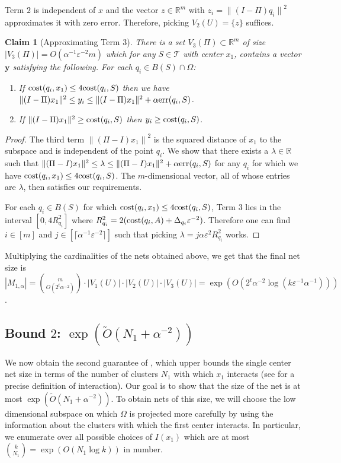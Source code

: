 \documentclass[11pt]{article}
\newtheorem{claim}[lemma]{Claim}
\theoremstyle{restate}
\theoremstyle{definition}
\newcommand{\eps}{\ensuremath{\varepsilon}}
\newcommand{\R}{\ensuremath{\mathbb{R}}}
\newcommand{\norm}[1]{\ensuremath{\|#1\|}}
\newcommand{\vecy}{\ensuremath{\mathbf{y}}}
\newcommand{\cost}{\textnormal{cost}}
\newcommand{\err}{\textnormal{err}}
\begin{document}
Term $2$ is independent of $x$ and the vector $z \in \R^m$ with $z_i =\norm{(I-\Pi)q_i}^2$ approximates it with zero error. Therefore, picking $V_2(U) = \{z\}$ suffices.

\begin{claim}[Approximating Term 3]\label{clm: term-3}
        There  is a set $V_3(\Pi) \subset \R^m$ of size $|V_3(\Pi)| = O(\alpha^{-1}\eps^{-2}m)$ which for any $S \in \mathcal{T}$ with center $x_1$, contains a vector $\vecy$ satisfying the following. For each $q_i \in B(S) \cap \Omega$:
    \begin{enumerate}
        \item If $\cost(q_i, x_1) \leq 4 \cost(q_i,S)$ then we have $\norm{(I - \Pi)x_1}^2\leq y_i \leq \norm{(I - \Pi)x_1}^2+\alpha \err(q_i,S) $.
        \item If $\norm{(I - \Pi)x_1}^2 \geq \cost(q_i, S)$ then $y_i \geq \cost(q_i,S)$.
    \end{enumerate}
\end{claim}
\begin{proof}
The third term $\norm{(\Pi - I) x_1}^2$ is the squared distance of $x_1$ to the subspace and is independent of the point $q_i$. We show that there exists a $\lambda \in \R$ such that $\norm{(\Pi - I)x_1}^2 \leq \lambda \leq \norm{(\Pi - I)x_1}^2 + \alpha \err(q_i,S)$ for any $q_i$ for which we have $\cost(q_i,x_1) \leq 4 \cost(q_i,S)$. The $m$-dimensional vector, all of whose entries are $\lambda$, then satisfies our requirements.

For each $q_i \in B(S)$ for which $\cost(q_i, x_1) \leq 4 \cost(q_i, S)$, Term $3$ lies in the interval $[0, 4R_{q_i}^2]$ where $R_{q_{i}}^2 = 2(\cost(q_i,A) + \Delta_{q_i} \eps^{-2})$. Therefore one can find $i \in [m]$ and $j \in [ \lceil\alpha^{-1} \eps^{-2} \rceil]$ such that  picking $\lambda= j \alpha \eps^2 R_{q_i}^2$ works.\qedhere

\end{proof}

Multiplying the cardinalities of the nets obtained above, we get that the final net size is $|M_{1,\alpha}| = \binom{m}{O(2^t \alpha^{-2})} \cdot |V_1(U)| \cdot |V_2(U)|
 \cdot |V_3(U)| = \exp(O(2^t \alpha^{-2} \log(k\eps^{-1} \alpha^{-1})))$.




\subsection{\texorpdfstring{Bound $2$: $\exp(\tilde{O}(N_1 + \alpha^{-2}))$}{Bound 2}}
We now obtain the second guarantee of  , which upper bounds the single center net size in terms of the number of clusters $N_1$ with which $x_1$ interacts (see  for a precise definition of interaction). Our goal is to show that the size of the net is at most $\exp(\tilde{O}(N_1 + \alpha^{-2}))$. 
 To obtain nets of this size, we will choose the low dimensional subspace on which $\Omega$ is projected more carefully by using the information about the clusters with which the first center interacts. In particular, we enumerate over all possible choices of $I(x_1)$ which are at most $\binom{k}{N_1} 
= \exp(O(N_1 \log k))$ in number. 
\end{document}
